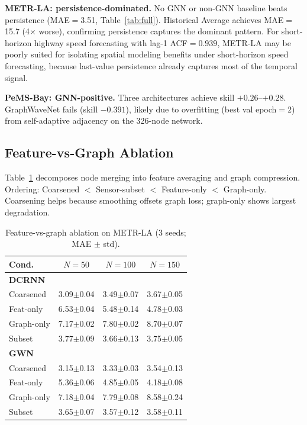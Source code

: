\documentclass[sigconf]{acmart}
\begin{document}
\textbf{METR-LA: persistence-dominated.} No GNN or non-GNN baseline beats persistence (MAE$=$3.51, Table~\ref{tab:full}). Historical Average achieves MAE$=$15.7 (4$\times$ worse), confirming persistence captures the dominant pattern. For short-horizon highway speed forecasting with lag-1 ACF${=}0.939$, METR-LA may be poorly suited for isolating spatial modeling benefits under short-horizon speed forecasting, because last-value persistence already captures most of the temporal signal.

\textbf{PeMS-Bay: GNN-positive.} Three architectures achieve skill $+0.26$--$+0.28$. GraphWaveNet fails (skill $-0.391$), likely due to overfitting (best val epoch${=}2$) from self-adaptive adjacency on the 326-node network.

\subsection{Feature-vs-Graph Ablation}

Table~\ref{tab:ablation} decomposes node merging into feature averaging and graph compression. Ordering: Coarsened $<$ Sensor-subset $<$ Feature-only $<$ Graph-only. Coarsening helps because smoothing offsets graph loss; graph-only shows largest degradation.

\begin{table}[t]
\small
\centering
\caption{Feature-vs-graph ablation on METR-LA (3 seeds; MAE $\pm$ std).}
\label{tab:ablation}
\begin{tabular}{@{}lccc@{}}
\toprule
Cond.\ & $N{=}50$ & $N{=}100$ & $N{=}150$ \\
\midrule
\textbf{DCRNN} & & & \\
Coarsened    & 3.09{\scriptsize$\pm$0.04} & 3.49{\scriptsize$\pm$0.07} & 3.67{\scriptsize$\pm$0.05} \\
Feat-only    & 6.53{\scriptsize$\pm$0.04} & 5.48{\scriptsize$\pm$0.14} & 4.78{\scriptsize$\pm$0.03} \\
Graph-only   & 7.17{\scriptsize$\pm$0.02} & 7.80{\scriptsize$\pm$0.02} & 8.70{\scriptsize$\pm$0.07} \\
Subset       & 3.77{\scriptsize$\pm$0.09} & 3.66{\scriptsize$\pm$0.13} & 3.75{\scriptsize$\pm$0.05} \\
\midrule
\textbf{GWN} & & & \\
Coarsened    & 3.15{\scriptsize$\pm$0.13} & 3.33{\scriptsize$\pm$0.03} & 3.54{\scriptsize$\pm$0.13} \\
Feat-only    & 5.36{\scriptsize$\pm$0.06} & 4.85{\scriptsize$\pm$0.05} & 4.18{\scriptsize$\pm$0.08} \\
Graph-only   & 7.18{\scriptsize$\pm$0.04} & 7.79{\scriptsize$\pm$0.08} & 8.58{\scriptsize$\pm$0.24} \\
Subset       & 3.65{\scriptsize$\pm$0.07} & 3.57{\scriptsize$\pm$0.12} & 3.58{\scriptsize$\pm$0.11} \\
\bottomrule
\end{tabular}
\end{table}
\end{document}
